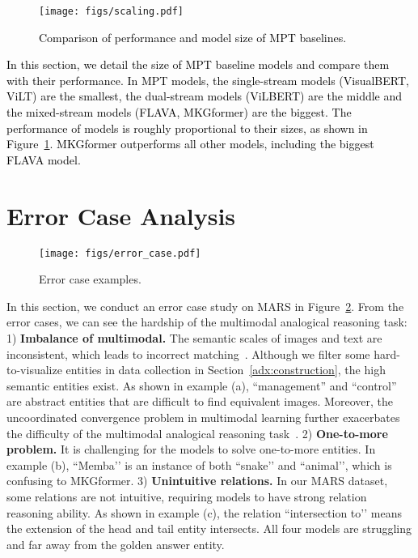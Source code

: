 \documentclass{article} \usepackage{iclr2023_conference,times}
\newcommand{\data}{MARS}
\begin{document}
\begin{figure}[!htp]
\centering
\texttt{[image: figs/scaling.pdf]}
\caption{\textcolor{black}{Comparison of performance and model size of MPT baselines.}}
\label{fig:adx_sclaing}
\end{figure}

\textcolor{black}{In this section, we detail the size of MPT baseline models and compare them with their performance. In MPT models, the single-stream models (VisualBERT, ViLT) are the smallest, the dual-stream models (ViLBERT) are the middle and the mixed-stream models (FLAVA, MKGformer) are the biggest. The performance of models is roughly proportional to their sizes, as shown in Figure~\ref{fig:adx_sclaing}. MKGformer outperforms all other models, including the biggest FLAVA model.}


\section{Error Case Analysis}
\label{adx:error_case}

\begin{figure}[!t]
\centering
\texttt{[image: figs/error\_case.pdf]}
\caption{Error case examples.}
\label{fig:adx_error_case}
\end{figure}

In this section, we conduct an error case study on {\data} in Figure~\ref{fig:adx_error_case}. From the error cases, we can see the hardship of the multimodal analogical reasoning task: 
1) \textbf{Imbalance of multimodal.} The semantic scales of images and text are inconsistent, which leads to incorrect matching~\citep{DBLP:journals/corr/abs-2202-05786}. Although we filter some hard-to-visualize entities in data collection in Section~\ref{adx:construction}, the high semantic entities exist. As shown in example (a), ``management''  and ``control'' are abstract entities that are difficult to find equivalent images. Moreover, the uncoordinated convergence problem in multimodal learning further exacerbates the difficulty of the multimodal analogical reasoning task~\citep{DBLP:journals/corr/abs-2203-15332, DBLP:conf/cvpr/WangTF20}.
2) \textbf{One-to-more problem.} It is challenging for the models to solve one-to-more entities. In example (b), ``Memba’’ is an instance of both ``snake’’ and ``animal’', which is confusing to MKGformer.
3) \textbf{Unintuitive relations.} In our {\data} dataset, some relations are not intuitive, requiring models to have strong relation reasoning ability. As shown in example (c), the relation ``intersection to’’  means the extension of the head and tail entity intersects. All four models are struggling and far away from the golden answer entity.
\end{document}
